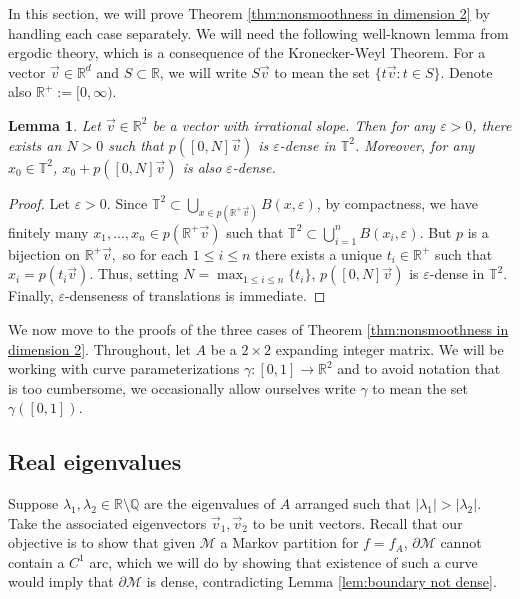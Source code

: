 \documentclass{article}
\def\Q{\mathbb{Q}}
\def\R{\mathbb{R}}
\def\T{\mathbb{T}}
\def\M{\mathcal{M}}
\newtheorem{lemma}[theorem]{Lemma}
\begin{document}
In this section, we will prove Theorem \ref{thm:nonsmoothness in dimension 2} by handling each case separately. We will need the following well-known lemma from ergodic theory, which is a consequence of the Kronecker-Weyl Theorem. For a vector $\vec v\in \R^d$ and $S\subset \R$, we will write $S\vec v$ to mean the set $\{t\vec v :t\in S\}$. Denote also $\R^+:=[0,\infty)$.



\begin{lemma}\label{lem-irrationalslopemeansuniformlydense}
    Let $\vec v \in\R^2$ be a vector with irrational slope. Then for any $\varepsilon>0$, there exists an $N>0$ such that $p([0,N]\vec v )$ is $\varepsilon$-dense in $\T^2$. Moreover, for any $x_0\in\T^2$, $x_0+p([0,N]\vec v)$ is also $\varepsilon$-dense. 
\end{lemma}

\begin{proof}
    Let $\varepsilon > 0$. Since $\T^2\subset \bigcup_{x\in p(\R^+\vec{v})}B(x,\varepsilon)$, by compactness, we have finitely many $x_1,...,x_n\in p(\R^+\vec{v})$ such that $\T^2\subset \bigcup_{i=1}^nB(x_i,\varepsilon)$. But $p$ is a bijection on $\R^+\vec{v},$ so for each $1\leq i\leq n$ there exists a unique $t_i\in \R^+$ such that $x_i=p(t_i\vec{v})$. Thus, setting $N=\max_{1\leq i \leq n}\{t_i\}$,  $p([0,N]\vec{v})$ is $\varepsilon$-dense in $\T^2$. Finally, $\varepsilon$-denseness of translations is immediate.
\end{proof}

We now move to the proofs of the three cases of Theorem \ref{thm:nonsmoothness in dimension 2}. Throughout, let $A$ be a $2\times 2$ expanding integer matrix. We will be working with curve parameterizations $\gamma:[0,1]\to \R^2$ and to avoid notation that is too cumbersome, we occasionally allow ourselves write $\gamma$ to mean the set $\gamma([0,1])$. 

\subsection{Real eigenvalues}
\label{subsection: Real Eigenvals}


Suppose $\lambda_1,\lambda_2\in \R\setminus\Q$ are the eigenvalues of $A$ arranged such that $|\lambda_1|>|\lambda_2|$. Take the associated eigenvectors $\vec v_1, \vec v_2$ to be unit vectors. Recall that our objective is to show that given $\M$ a Markov partition for $f=f_A$, $\partial\M$ cannot contain a $C^1$ arc, which we will do by showing that existence of such a curve would imply that $\partial \M$ is dense, contradicting Lemma \ref{lem:boundary not dense}.
\end{document}
